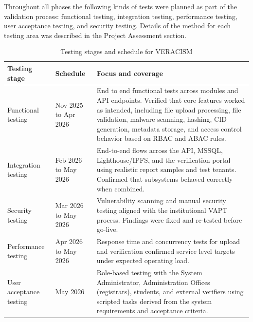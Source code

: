 Throughout all phases the following kinds of tests were planned as part of the validation process: functional testing, integration testing, performance testing, user acceptance testing, and security testing. Details of the method for each testing area was described in the Project Assessment section.

\begin{table}[H]
  \centering
  \smalltable
  \footnotesize

  {%
  \setlength{\tabcolsep}{8pt}%
  \renewcommand{\arraystretch}{1.4}%

  \begin{tabular}{|>{\raggedright\arraybackslash}p{}|
                  >{\raggedright\arraybackslash}p{}|
                  >{\raggedright\arraybackslash}p{}|}
    \hline
    \textbf{Testing stage} & \textbf{Schedule} & \textbf{Focus and coverage} \\
    \hline\hline

    Functional testing &
    Nov 2025 to Apr 2026 &
    End to end functional tests across modules and API endpoints. Verified that core features worked as intended, including file upload processing, file validation, malware scanning, hashing, CID generation, metadata storage, and access control behavior based on RBAC and ABAC rules. \\
    \hline

    Integration testing &
    Feb 2026 to May 2026 &
    End-to-end flows across the API, MSSQL, Lighthouse/IPFS, and the verification portal using realistic report samples and test tenants. Confirmed that subsystems behaved correctly when combined. \\
    \hline

    Security testing &
    Mar 2026 to May 2026 &
    Vulnerability scanning and manual security testing aligned with the institutional VAPT process. Findings were fixed and re-tested before go-live. \\
    \hline

    Performance testing &
    Apr 2026 to May 2026 &
    Response time and concurrency tests for upload and verification confirmed service level targets under expected operating load. \\
    \hline

    User acceptance testing &
    May 2026 &
    Role-based testing with the System Administrator, Administration Offices (registrars), students, and external verifiers using scripted tasks derived from the system requirements and acceptance criteria. \\
    \hline

  \end{tabular}
  }%

  \captionsetup{type=table}
  \caption{Testing stages and schedule for VERACISM}
  \label{tab:testing-stages-schedule}
\end{table}

